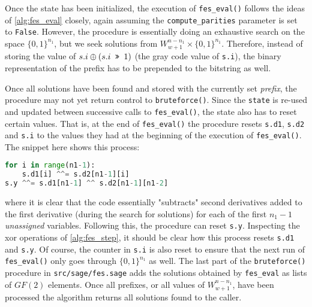 Once the state has been initialized, the execution of \texttt{fes\_eval()} follows the ideas of \cref{alg:fes_eval} closely, again assuming the \texttt{compute\_parities} parameter is set to \texttt{False}. However, the procedure is essentially doing an exhaustive search on the space $\{0,1\}^{n_1}$, but we seek solutions from $W^{n - n_1}_{w + 1} \times \{0, 1\}^{n_1}$. Therefore, instead of storing the value of $s.i \oplus (s.i \texttt{ >> } 1)$ (the gray code value of \texttt{s.i}), the binary representation of the prefix has to be prepended to the bitstring as well. 

Once all solutions have been found and stored with the currently set \textit{prefix}, the procedure may not yet return control to \texttt{bruteforce()}. Since the \texttt{state} is re-used and updated between successive calls to \texttt{fes\_eval()}, the state also has to reset certain values. That is, at the end of \texttt{fes\_eval()} the procedure resets \texttt{s.d1}, \texttt{s.d2} and \texttt{s.i} to the values they had at the beginning of the execution of \texttt{fes\_eval()}. The snippet here shows this process:
\begin{lstlisting}[language=Python,style=mystyle]
for i in range(n1-1):
    s.d1[i] ^^= s.d2[n1-1][i]
s.y ^^= s.d1[n1-1] ^^ s.d2[n1-1][n1-2]
\end{lstlisting}
where it is clear that the code essentially "subtracts" second derivatives added to the first derivative (during the search for solutions) for each of the first $n_1-1$ \textit{unassigned} variables. Following this, the procedure can reset \texttt{s.y}. Inspecting the xor operations of \cref{alg:fes_step}, it should be clear how this process resets \texttt{s.d1} and \texttt{s.y}. Of course, the counter in \texttt{s.i} is also reset to ensure that the next run of \texttt{fes\_eval()} only goes through $\{0,1\}^{n_1}$ as well. 
The last part of the \texttt{bruteforce()} procedure in \texttt{src/sage/fes.sage} adds the solutions obtained by \texttt{fes\_eval} as lists of $GF(2)$ elements. Once all prefixes, or all values of $W^{n - n_1}_{w + 1}$, have been processed the algorithm returns all solutions found to the caller.

